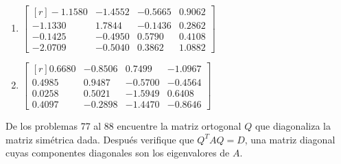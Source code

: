 \begin{enumerate}[start=75]
    \item $\begin{bmatrix*}[r]-1.1580 & -1.4552 & -0.5665 & 0.9062 \\ -1.1330 & 1.7844 & -0.1436 & 0.2862 \\ -0.1425 & -0.4950 & 0.5790 & 0.4108 \\ -2.0709 & -0.5040 & 0.3862 & 1.0882\end{bmatrix*}$
    \item $\begin{bmatrix*}[r]0.6680 & -0.8506 & 0.7499 & -1.0967 \\ 0.4985 & 0.9487 & -0.5700 & -0.4564 \\ 0.0258 & 0.5021 & -1.5949 & 0.6408 \\ 0.4097 & -0.2898 & -1.4470 & -0.8646\end{bmatrix*}$
\end{enumerate}
De los problemas 77 al 88 encuentre la matriz ortogonal $Q$ que diagonaliza la matriz simétrica dada. Después verifique que $Q^{T} A Q=D$, una matriz diagonal cuyas componentes diagonales son los eigenvalores de $A$.
